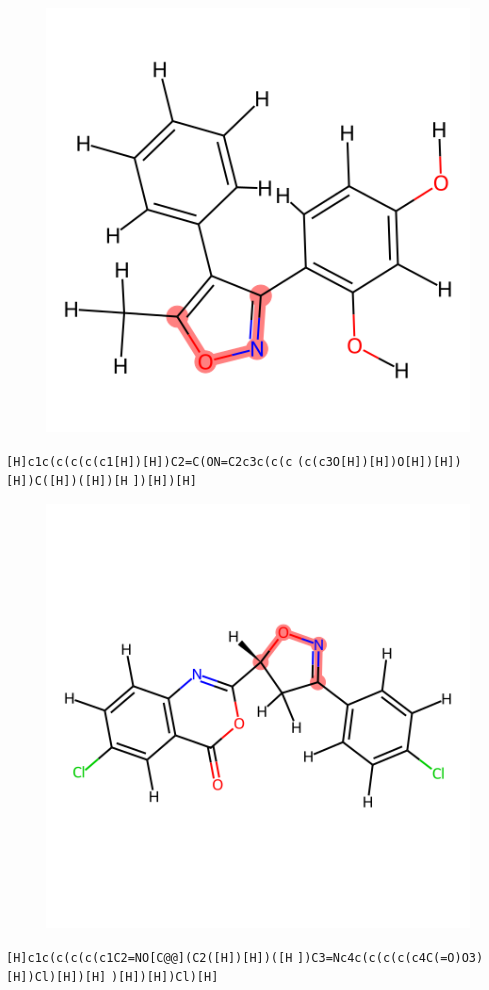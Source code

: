 \documentclass{article}
\begin{document}
\begin{figure}[ht]
\centering
    \includegraphics{mol222.png}
\end{figure}
\verb|[H]c1c(c(c(c(c1[H])[H])C2=C(ON=C2c3c(c(c| \verb|(c(c3O[H])[H])O[H])[H])[H])C([H])([H])[H| \verb|])[H])[H]|

\begin{figure}[ht]
\centering
    \includegraphics{mol223.png}
\end{figure}
\verb|[H]c1c(c(c(c(c1C2=NO[C@@](C2([H])[H])([H| \verb|])C3=Nc4c(c(c(c(c4C(=O)O3)[H])Cl)[H])[H]| \verb|)[H])[H])Cl)[H]|
\end{document}
